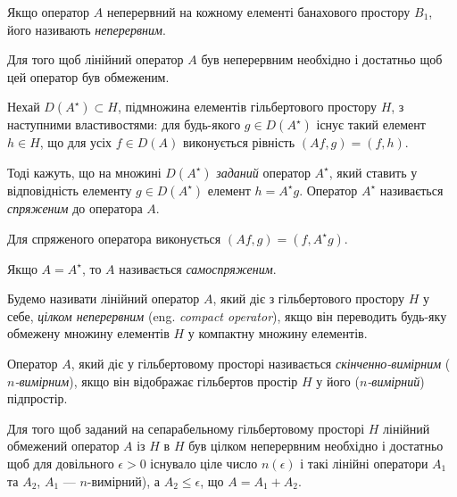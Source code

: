 \begin{definition}
    Якщо оператор $A$ неперервний на кожному елементі банахового простору $B_1$, його називають \emph{неперервним}.
\end{definition}

\begin{proposition}
    Для того щоб лінійний оператор $A$ був неперервним необхідно і достатньо щоб цей оператор був обмеженим.
\end{proposition}

Нехай $D(A^\star) \subset H$, підмножина елементів гільбертового простору $H$, з наступними властивостями: для будь-якого $g \in D(A^\star)$ існує такий елемент $h \in H$, що для усіх $f \in D(A)$ виконується рівність $(A f, g) = (f, h)$.

\begin{definition}
    Тоді кажуть, що на множині $D(A^\star)$ \emph{заданий} оператор $A^\star$, який ставить у відповідність елементу $g \in D(A^\star)$ елемент $h = A^\star g$. Оператор $A^\star$ називається \emph{спряженим} до оператора $A$.
\end{definition}

\begin{proposition}
    Для  спряженого оператора виконується $(A f, g) = (f, A^\star g)$.
\end{proposition}

\begin{definition}
    Якщо $A = A^\star$, то $A$ називається \emph{самоспряженим}.
\end{definition}

\begin{definition}
    Будемо називати лінійний оператор $A$, який діє з гільбертового простору $H$ у себе, \emph{цілком неперервним} (eng. \emph{compact operator}), якщо він переводить будь-яку обмежену множину елементів $H$ у компактну множину елементів.
\end{definition}

\begin{definition}
    Оператор $A$, який діє у гільбертовому просторі називається \emph{скінченно-вимірним} (\emph{$n$-вимірним}), якщо він відображає гільбертов простір $H$ у його (\emph{$n$-вимірний}) підпростір.
\end{definition}

\begin{theorem}
    Для того щоб заданий на сепарабельному гільбертовому просторі $H$ лінійний обмежений оператор $A$ із $H$ в $H$ був цілком неперервним необхідно і достатньо щоб для довільного $\epsilon > 0$ існувало ціле число $n(\epsilon)$ і такі лінійні оператори $A_1$ та $A_2$, $A_1$ --- $n$-вимірний), а $A_2 \le \epsilon$, що $A = A_1 + A_2$. 
\end{theorem}

